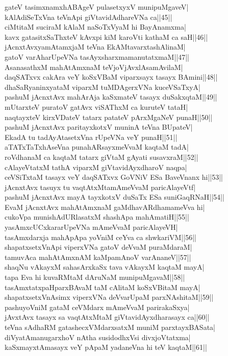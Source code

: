 \documentclass{article}
\begin{document}
gateV tasimxnamxhABAgeV pulasetxyxV munipuMgaveV|\\
kAlAdiSeTxVna teVnApi giVtavidAdhareVNa ca||45||\\
ciMtitaM suciraM kAlaM naSoTxVyaM hi BayAnamxma|\\
kavx gatasitxSaThxteV kAvxpi kiM karoVti kathaM ca saH||46||\\
jAcnxtAvxyamAtamxjaM teVna EkAMtavarxtashAlinaM|\\
gatoV varAharUpeVNa tasAyxsharxmamanutatxmaM||47||\\
AsanasathxM mahAtAmxnaM teVjoVjAvxlAsamAvilaM|\\
daqSATxvx cakAra veY koSxVBaM viparxsayx tasayx BAmini||48||\\
dhaSaRyaninxyataM viparxM tuMDAgerxVNa kuceVSaTxyA|\\
pashuM jAcnxtAvx mahArAja kaSxmateV tasayx duSakxqtaM||49||\\
mUtarxteV puratoV gatAvx viSAThxM ca kuruteV tataH|\\
naqtayxteV kirxVDateV tatarx patateV pArxMgaNeV punaH||50||\\
pashuM jAcnxtAvx paritayxkotxV muninA teVna BUpateV|\\
EkadA tu tadAyAtasetxVna rUpeVNa veY punaH||51||\\
aTATxTaTxhAseVna punahARsayxmeVvaM kaqtaM tadA|\\
roVdhanaM ca kaqtaM tatarx giVtaM gAyati susavxraM||52||\\
cAlayeVtatxM tathA viparxM giVtavidAyxdharoV naqpa|\\
ceVSiTxtaM tasayx veY daqSATxvx GoVNiV ESa BaveVnanx hi||53||\\
jAcnxtAvx tasuyx tu vaqtAtxMtamAmeVvaM paricAlayeVtf|\\
pashuM jAcnxtAvx mayA tayxkotxV duSaTx ESa suniGaqRNaH||54||\\
EvaM jAcnxtAvx mahAtAmxnaM gaMdhavARdhamameVva hi|\\
cukoVpa munishAdURlasatxM shashApa mahAmatiH||55||\\
yasAmxcUCxkararUpeVNa mAmeVvaM paricAlayeVH|\\
tasAmxdarxja mahApApa yoVniM ceYva ca shwkariVM||56||\\
shapatxsetxVnApi viperxVNa gatoV deVvaM puraMdaraM|\\
tamuvAca mahAtAmxnAM kaMpamAnoV varAnaneV||57||\\
shaqNu vAkayxM sahasArxkaSx tava vAkayxM kaqtaM mayA|\\
tapa Eva hi kuvaRMtaM dAruNaM munipuMgavaM||58||\\
tasAmxtatxpaHparxBAvaM taM cAlitaM koSxVBitaM mayA|\\
shapatxsetxVnAsimx viperxVNa deVvarUpaM parxNAshitaM||59||\\
pashuyoVniM gataM ceVMdarx mAmeVvaM parirakaSxya|\\
jAvxtAvx tasayx sa vaqtAtxMtaM giVtavidAyxdharasayx ca||60||\\
teVna sAdhaRM gatashecxVMdarxsatxM muniM parxtayxBASata|\\
diVyatAmanugarxhoV nAtha susidodhxVsi divxjoVtatxma|\\
kaSxmayxtAmasayx veY pApaM yadaneVna hi teV kaqtaM||61||\\
\end{document}
